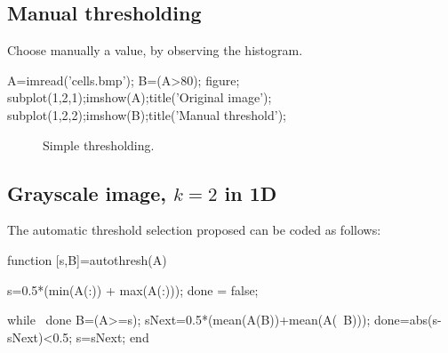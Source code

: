 \def\QRCODE{TB_image_TUT.IMG.image_segmentation_histogram_clustering_matlabqrcode.png}
\def\QRPAGE{http://www.iptutorials.science/tree/master/TB_image/TUT.IMG.image_segmentation_histogram_clustering/matlab}

\subsection{Manual thresholding}
Choose manually a value, by observing the histogram.

\begin{matlab}
A=imread('cells.bmp');
B=(A>80);
figure;
subplot(1,2,1);imshow(A);title('Original image');
subplot(1,2,2);imshow(B);title('Manual threshold');
\end{matlab}

\begin{figure}[htbp]
\centering
  \hspace{1cm}
 \caption{Simple thresholding.}
\end{figure}


\subsection{Grayscale image, $k=2$ in 1D}
The automatic threshold selection proposed can be coded as follows:
\begin{matlab}
function [s,B]=autothresh(A)

s=0.5*(min(A(:)) + max(A(:)));
done = false;

while ~done
    B=(A>=s);
    sNext=0.5*(mean(A(B))+mean(A(~B)));
    done=abs(s-sNext)<0.5; %
    s=sNext;
end
\end{matlab}

